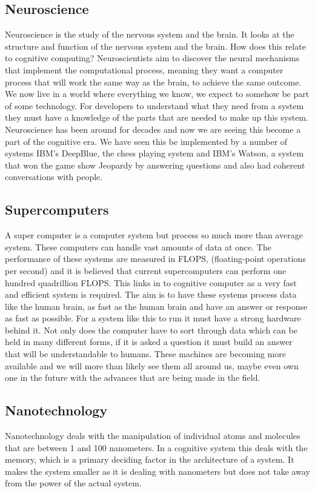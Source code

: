 \documentclass[journal]{IEEEtran}
\begin{document}
\subsection{Neuroscience}
Neuroscience is the study of the nervous system and the brain. It looks at the structure and function of the nervous system and the brain. How does this relate to cognitive computing? Neuroscientists aim to discover the neural mechanisms that implement the computational process, meaning they want a computer process that will work the same way as the brain, to achieve the same outcome\cite{neuro}. We now live in a world where everything we know, we expect to somehow be part of some technology. For developers to understand what they need from a system they must have a knowledge of the parts that are needed to make up this system. Neuroscience has been around for decades and now we are seeing this become a part of the cognitive era. We have seen this be implemented by a number of systems IBM's DeepBlue\cite{DeepBlue}, the chess playing system and IBM's Watson, a system that won the game show Jeopardy by answering questions\cite{watsonAnswer} and also had coherent conversations with people.

\subsection{Supercomputers}
A super computer is a computer system but process so much more than average system. These computers can handle vast amounts of data at once. The performance of these systems are measured in FLOPS, (floating-point operations per second) and it is believed that current supercomputers can perform one hundred quadrillion FLOPS. This links in to cognitive computer as a very fast and efficient system is required. The aim is to have these systems process data like the human brain, as fast as the human brain and have an answer or response as fast as possible. For a system like this to run it must have a strong hardware behind it. Not only does the computer have to sort through data which can be held in many different forms, if it is asked a question it must build an answer that will be understandable to humans. These machines are becoming more available and we will more than likely see them all around us, maybe even own one in the future with the advances that are being made in the field\cite{super}.

\subsection{Nanotechnology}
Nanotechnology deals with the manipulation of individual atoms and molecules that are between 1 and 100 nanometers. In a cognitive system this deals with the memory, which is a primary deciding factor in the architecture of a system. It makes the system smaller as it is dealing with nanometers but does not take away from the power of the actual system\cite{nano}.
\end{document}
